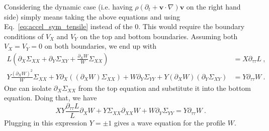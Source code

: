 \documentclass[12pt,a4paper]{article}
\begin{document}
Considering the dynamic case (i.e. having $\rho\left(\partial_t + \bm{v}\cdot\nabla\right)\bm{v}$ on the right hand side) simply means taking the above equations and using Eq.~\eqref{eq:accel_sym_tensile} instead of the $0$. This would require the boundary conditions of $V_X$ and $V_Y$ on the top and bottom boundaries. Assuming both $V_X = V_Y = 0$ on both boundaries, we end up with
\begin{equation}\label{eq:div_stress_sym_tensile_dynamics}
  \begin{split}
     L\left(\partial_X\Sigma_{XX} + \partial_Y\Sigma_{XY} + \frac{\partial_X W}{W} \Sigma_{XX}\right) & = X \partial_{\tau\tau} L \ , \\
      Y\frac{\left(\partial_X W\right)^2}{W}\Sigma_{XX} + Y \partial_X \left(\left(\partial_X W\right) \Sigma_{XX}\right) +  W\partial_Y\Sigma_{YY} + Y\left(\partial_X W\right)\left( \partial_Y \Sigma_{XY}\right) & = Y \partial_{\tau\tau} W \ .
  \end{split}
\end{equation}
One can isolate $\partial_X \Sigma_{XX}$ from the top equation and substitute it into the bottom equation. Doing that, we have
\begin{equation}\label{eq:div_stress_sym_tensile_combined}
  X Y\frac{\partial_{\tau \tau} L}{L}\partial_X W + Y\Sigma_{XX}\partial_{XX}W + W\partial_Y \Sigma_{YY} = Y\partial_{\tau\tau}W \ .
\end{equation}
Plugging in this expression $Y=\pm1$ gives a wave equation for the profile $W$.
\end{document}
